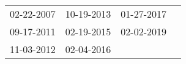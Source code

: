 \begin{supertabular}{llll}
 02-22-2007 &  10-19-2013 &  01-27-2017 \\
 09-17-2011 &  02-19-2015 &  02-02-2019 \\
 11-03-2012 &  02-04-2016 &             \\
\end{supertabular}
